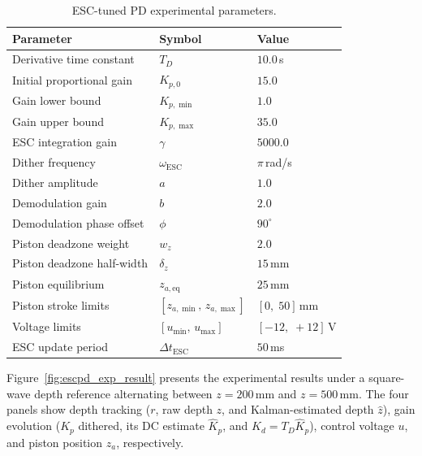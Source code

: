 ﻿\documentclass[subscriptcorrection,upint,varvw,barcolor=Goldenrod3,mathalfa=cal=euler,balance,hyphenate,french,pdf-a]{asmejour}
\begin{document}
\begin{table}[t]
\centering
\caption{ESC-tuned PD experimental parameters.}
\label{tab:esc_exp_params}
\begin{tabular}{lll}
\hline
\textbf{Parameter} & \textbf{Symbol} & \textbf{Value} \\
\hline
Derivative time constant        & $T_D$             & $10.0$\,s \\
Initial proportional gain       & $K_{p,0}$         & $15.0$ \\
Gain lower bound                & $K_{p,\min}$      & $1.0$ \\
Gain upper bound                & $K_{p,\max}$      & $35.0$ \\
ESC integration gain            & $\gamma$          & $5000.0$ \\
Dither frequency                & $\omega_{\mathrm{ESC}}$ & $\pi$\,rad/s \\
Dither amplitude                & $a$               & $1.0$ \\
Demodulation gain               & $b$               & $2.0$ \\
Demodulation phase offset       & $\phi$            & $90^{\circ}$ \\
Piston deadzone weight          & $w_z$             & $2.0$ \\
Piston deadzone half-width      & $\delta_z$        & $15$\,mm \\
Piston equilibrium              & $z_{a,\mathrm{eq}}$ & $25$\,mm \\
Piston stroke limits            & $[z_{a,\min},\,z_{a,\max}]$ & $[0,\;50]$\,mm \\
Voltage limits                  & $[u_{\min},\,u_{\max}]$ & $[-12,\;+12]$\,V \\
ESC update period               & $\Delta t_{\mathrm{ESC}}$ & $50$\,ms \\
\hline
\end{tabular}
\end{table}

Figure~\ref{fig:escpd_exp_result} presents the experimental results under a square-wave depth reference alternating between $z = 200$\,mm and $z = 500$\,mm. The four panels show depth tracking ($r$, raw depth $z$, and Kalman-estimated depth $\hat{z}$), gain evolution ($K_p$ dithered, its DC estimate $\hat{K}_p$, and $K_d = T_D \hat{K}_p$), control voltage $u$, and piston position $z_a$, respectively.
\end{document}
